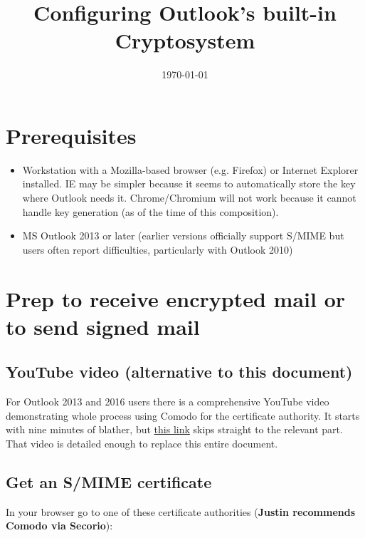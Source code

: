\documentclass[pdftex,12pt,titlepage=false]{scrartcl}
\title{\rmfamily Configuring Outlook's built-in Cryptosystem}
\date{\rmfamily\today}
\begin{document}
\maketitle

\tableofcontents

\section{Prerequisites}
\begin{itemize}
\item Workstation with a Mozilla-based browser (e.g. Firefox) or
  Internet Explorer installed.  IE may be simpler because it seems to
  automatically store the key where Outlook needs it.  Chrome/Chromium
  will not work because it cannot handle key generation (as of the
  time of this composition).
\item MS Outlook 2013 or later (earlier versions officially support
  S/MIME but users often report difficulties, particularly with
  Outlook 2010)
\end{itemize}

\section{Prep to receive encrypted mail or to send signed mail}
\subsection{YouTube video (alternative to this document)}
For Outlook 2013 and 2016 users there is a comprehensive YouTube video
demonstrating whole process using Comodo for the certificate
authority.  It starts with nine minutes of blather, but {\large
  \href{https://www.youtube.com/watch?v=sfancZGEGjg\&start=535}{this
    link}} skips straight to the relevant part.  That video is
detailed enough to replace this entire document.

\subsection{Get an S/MIME certificate}\label{catable}
In your browser go to one of these certificate authorities (\textbf{Justin recommends Comodo via Secorio}):\\
\end{document}
